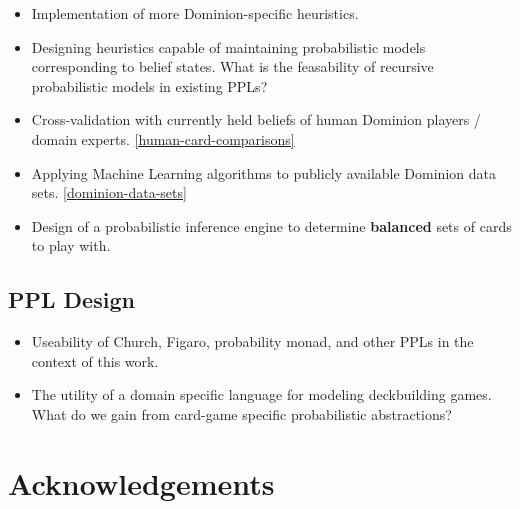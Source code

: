 



\begin{itemize}
\item Implementation of more Dominion-specific heuristics.
\item Designing heuristics capable of maintaining probabilistic models
      corresponding to belief states. What is the feasability of recursive
      probabilistic models in existing PPLs?
\item Cross-validation with currently held beliefs of human Dominion
      players / domain experts. \ref{human-card-comparisons}
\item Applying Machine Learning algorithms to publicly available Dominion
      data sets. \ref{dominion-data-sets}
\item Design of a probabilistic inference engine to determine
      {\bf balanced} sets of cards to play with.
\end{itemize}

\subsection{PPL Design} \label{sec:future:PPL}

\begin{itemize}
\item Useability of Church, Figaro, probability monad, and other
      PPLs in the context of this work.
\item The utility of a domain specific language for modeling deckbuilding
      games. What do we gain from card-game specific probabilistic
      abstractions?
\end{itemize}


\section{Acknowledgements} \label{sec:ack}

